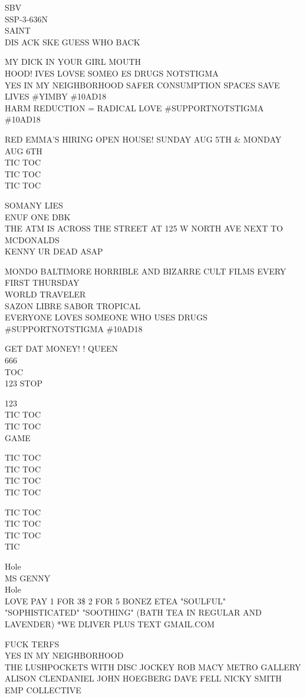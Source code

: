 \documentclass[10pt,letterpaper]{article}
\begin{document}
SBV\\
SSP{-}3{-}636N\\
SAINT\\
DIS ACK SKE GUESS WHO BACK

MY DICK IN YOUR GIRL MOUTH\\
HOOD!  IVES LOVSE SOMEO ES DRUGS NOTSTIGMA\\
YES IN MY NEIGHBORHOOD SAFER CONSUMPTION SPACES SAVE LIVES \#YIMBY \#10AD18\\
HARM REDUCTION = RADICAL LOVE \#SUPPORTNOTSTIGMA \#10AD18

RED EMMA'S HIRING OPEN HOUSE!   SUNDAY AUG 5TH \& MONDAY AUG 6TH\\
TIC TOC\\
TIC TOC\\
TIC TOC

SOMANY LIES\\
ENUF ONE DBK\\
THE ATM IS ACROSS THE STREET AT 125 W NORTH AVE NEXT TO MCDONALDS\\
KENNY UR DEAD ASAP

MONDO BALTIMORE HORRIBLE AND BIZARRE CULT FILMS EVERY FIRST THURSDAY\\
WORLD TRAVELER\\
SAZON LIBRE SABOR TROPICAL\\
EVERYONE LOVES SOMEONE WHO USES DRUGS \#SUPPORTNOTSTIGMA \#10AD18

GET DAT MONEY! ! QUEEN\\
666\\
TOC\\
123 STOP

123\\
TIC TOC\\
TIC TOC\\
GAME

TIC TOC\\
TIC TOC\\
TIC TOC\\
TIC TOC

TIC TOC\\
TIC TOC\\
TIC TOC\\
TIC

Hole\\
MS GENNY\\
Hole\\
LOVE PAY 1 FOR 3\$ 2 FOR 5 BONEZ ETEA "SOULFUL" "SOPHISTICATED" "SOOTHING" (BATH TEA IN REGULAR AND LAVENDER) *WE DLIVER PLUS TEXT GMAIL.COM

FUCK TERFS\\
YES IN MY NEIGHBORHOOD\\
THE LUSHPOCKETS WITH DISC JOCKEY ROB MACY METRO GALLERY\\
ALISON CLENDANIEL JOHN HOEGBERG DAVE FELL NICKY SMITH EMP COLLECTIVE
\end{document}

